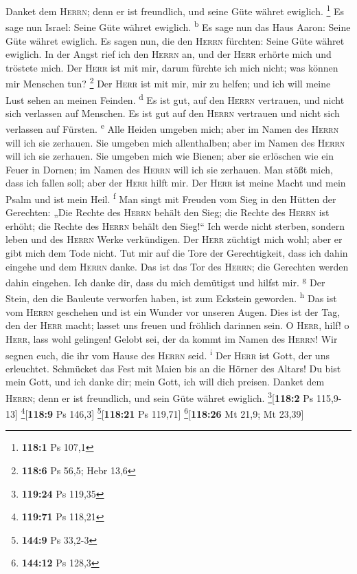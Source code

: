  Danket dem \textsc{Herrn}; denn er ist freundlich, und
seine Güte währet ewiglich. \footnote{\textbf{118:1} Ps 107,1}
 Es sage nun Israel: Seine Güte währet ewiglich.
\textsuperscript{b}  Es sage nun das Haus Aaron: Seine
Güte währet ewiglich.  Es sagen nun, die den
\textsc{Herrn} fürchten: Seine Güte währet ewiglich.  In
der Angst rief ich den \textsc{Herrn} an, und der \textsc{Herr} erhörte
mich und tröstete mich.  Der \textsc{Herr} ist mit mir,
darum fürchte ich mich nicht; was können mir Menschen tun? \footnote{\textbf{118:6}
  Ps 56,5; Hebr 13,6}  Der \textsc{Herr} ist mit mir, mir
zu helfen; und ich will meine Lust sehen an meinen Feinden.
\textsuperscript{d}  Es ist gut, auf den \textsc{Herrn}
vertrauen, und nicht sich verlassen auf Menschen.  Es ist
gut auf den \textsc{Herrn} vertrauen und nicht sich verlassen auf
Fürsten. \textsuperscript{e}  Alle Heiden umgeben mich;
aber im Namen des \textsc{Herrn} will ich sie zerhauen. 
Sie umgeben mich allenthalben; aber im Namen des \textsc{Herrn} will ich
sie zerhauen.  Sie umgeben mich wie Bienen; aber sie
erlöschen wie ein Feuer in Dornen; im Namen des \textsc{Herrn} will ich
sie zerhauen.  Man stößt mich, dass ich fallen soll; aber
der \textsc{Herr} hilft mir.  Der \textsc{Herr} ist meine
Macht und mein Psalm und ist mein Heil. \textsuperscript{f}
 Man singt mit Freuden vom Sieg in den Hütten der
Gerechten: „Die Rechte des \textsc{Herrn} behält den Sieg;
 die Rechte des \textsc{Herrn} ist erhöht; die Rechte des
\textsc{Herrn} behält den Sieg!{}``  Ich werde nicht
sterben, sondern leben und des \textsc{Herrn} Werke verkündigen.
 Der \textsc{Herr} züchtigt mich wohl; aber er gibt mich
dem Tode nicht.  Tut mir auf die Tore der Gerechtigkeit,
dass ich dahin eingehe und dem \textsc{Herrn} danke.  Das
ist das Tor des \textsc{Herrn}; die Gerechten werden dahin eingehen.
 Ich danke dir, dass du mich demütigst und hilfst mir.
\textsuperscript{g}  Der Stein, den die Bauleute
verworfen haben, ist zum Eckstein geworden. \textsuperscript{h}
 Das ist vom \textsc{Herrn} geschehen und ist ein Wunder
vor unseren Augen.  Dies ist der Tag, den der
\textsc{Herr} macht; lasset uns freuen und fröhlich darinnen sein.
 O \textsc{Herr}, hilf! o \textsc{Herr}, lass wohl
gelingen!  Gelobt sei, der da kommt im Namen des
\textsc{Herrn}! Wir segnen euch, die ihr vom Hause des \textsc{Herrn}
seid. \textsuperscript{i}  Der \textsc{Herr} ist Gott,
der uns erleuchtet. Schmücket das Fest mit Maien bis an die Hörner des
Altars!  Du bist mein Gott, und ich danke dir; mein Gott,
ich will dich preisen.  Danket dem \textsc{Herrn}; denn
er ist freundlich, und sein Güte währet ewiglich.
\footnote{\textbf{119:24} Ps 119,35}{[}\textbf{118:2} Ps 115,9-13{]}
\footnote{\textbf{119:71} Ps 118,21}{[}\textbf{118:9} Ps 146,3{]}
\footnote{\textbf{144:9} Ps 33,2-3}{[}\textbf{118:21} Ps 119,71{]}
\footnote{\textbf{144:12} Ps 128,3}{[}\textbf{118:26} Mt 21,9; Mt
23,39{]}

